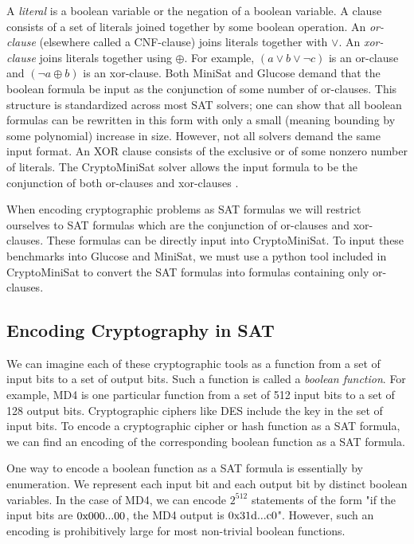 A \emph{literal} is a boolean variable or the negation of a boolean variable. A clause consists of a set of literals joined together by some boolean operation. An \emph{or-clause} (elsewhere called a CNF-clause) joins literals together with $\lor$. An \emph{xor-clause} joins literals together using $\oplus$. For example, $(a \lor b \lor \neg c)$ is an or-clause and $(\neg a \oplus b)$ is an xor-clause. Both MiniSat and Glucose demand that the boolean formula be input as the conjunction of some number of or-clauses. This structure is standardized across most SAT solvers; one can show that all boolean formulas can be rewritten in this form with only a small (meaning bounding by some polynomial) increase in size. However, not all solvers demand the same input format. An XOR clause consists of the exclusive or of some nonzero number of literals. The CryptoMiniSat solver allows the input formula to be the conjunction of both or-clauses and xor-clauses \cite{SNC09}. 

When encoding cryptographic problems as SAT formulas we will restrict ourselves to SAT formulas which are the conjunction of or-clauses and xor-clauses. These formulas can be directly input into CryptoMiniSat. To input these benchmarks into Glucose and MiniSat, we must use a python tool included in CryptoMiniSat to convert the SAT formulas into formulas containing only or-clauses.


\subsection{Encoding Cryptography in SAT}
\label{sec:encoding:desc}
We can imagine each of these cryptographic tools as a function from a set of input bits to a set of output 
bits. Such a function is called a \emph{boolean function}. For example, MD4 is one particular function from a set of 512 input bits to a set of 128 output bits. Cryptographic ciphers like DES include the key in the set of input bits. To encode a cryptographic cipher or hash function as a SAT formula, we can find an encoding of the corresponding boolean function as a SAT formula.

One way to encode a boolean function as a SAT formula is essentially by enumeration. We represent each input bit and each output bit by distinct boolean variables. In the case of MD4, we can encode $2^{512}$ statements of the form "if the input bits are $0\text{x000...00}$, the MD4 output is $0\text{x31d...c0}$". However, such an encoding is prohibitively large for most non-trivial boolean functions.

